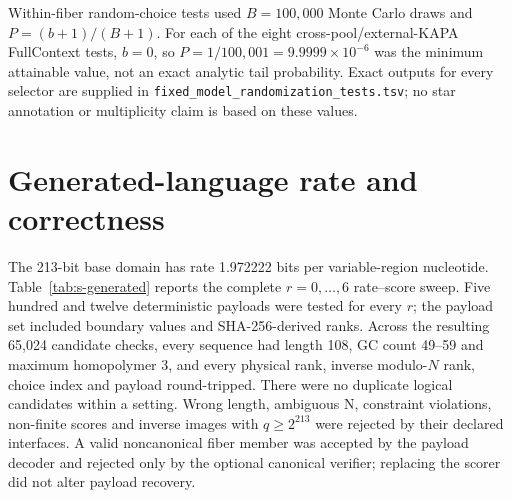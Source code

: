 \documentclass[10pt]{article}
\begin{document}
Within-fiber random-choice tests used $B=100{,}000$ Monte Carlo draws and $P=(b+1)/(B+1)$. For each of the eight cross-pool/external-KAPA FullContext tests, $b=0$, so $P=1/100{,}001=9.9999\times10^{-6}$ was the minimum attainable value, not an exact analytic tail probability. Exact outputs for every selector are supplied in \texttt{fixed\_model\_randomization\_tests.tsv}; no star annotation or multiplicity claim is based on these values.

\section{Generated-language rate and correctness}

The 213-bit base domain has rate 1.972222 bits per variable-region nucleotide. Table~\ref{tab:s-generated} reports the complete $r=0,\ldots,6$ rate--score sweep. Five hundred and twelve deterministic payloads were tested for every $r$; the payload set included boundary values and SHA-256-derived ranks. Across the resulting 65,024 candidate checks, every sequence had length 108, GC count 49--59 and maximum homopolymer 3, and every physical rank, inverse modulo-$N$ rank, choice index and payload round-tripped. There were no duplicate logical candidates within a setting. Wrong length, ambiguous N, constraint violations, non-finite scores and inverse images with $q\geq2^{213}$ were rejected by their declared interfaces. A valid noncanonical fiber member was accepted by the payload decoder and rejected only by the optional canonical verifier; replacing the scorer did not alter payload recovery.
\end{document}
